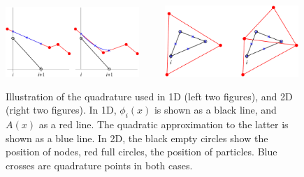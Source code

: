 \documentclass{ws-ijcm}
\begin{document}
\begin{figure}
  \centering
  \includegraphics[width=0.45\textwidth]{quadrature} $\qquad$
  \includegraphics[width=0.45\textwidth]{quadrature_2D}
  \caption{%
    Illustration of the quadrature used in 1D (left two figures), and
    2D (right two figures).
    In 1D, $\phi_i(x)$ is shown as a black line, and $A(x)$
    as a red line. The quadratic approximation to the latter is shown
    as a blue line. In 2D, the black empty circles show the position of nodes, red
    full circles, the position of particles. Blue crosses are quadrature
    points in both cases.
    \label{fig:quadrature}}
\end{figure}
\end{document}
